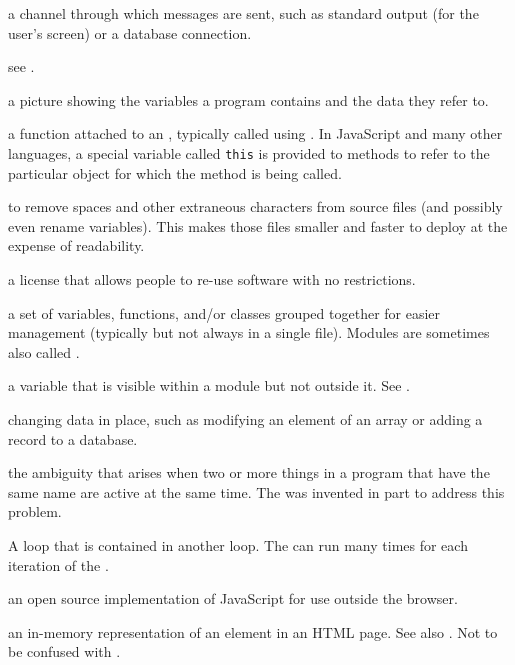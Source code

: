 \begin{description}
a channel through which  messages are sent, such as
standard output (for the user's screen) or a database connection.

see .

a picture showing the variables a program contains and the data they refer to.

a function attached to an , typically called using . In JavaScript and many other languages, a
special variable called \texttt{this} is provided to methods to refer to the
particular object for which the method is being called.

to remove spaces and other extraneous characters from source files (and
possibly even rename variables). This makes those files smaller and faster to
deploy at the expense of readability.

a license that allows people to re-use software with no restrictions.

a set of variables, functions, and/or classes grouped together for easier
management (typically but not always in a single file). Modules are sometimes
also called .

a variable that is visible within a module but not outside it. See
.

changing data in place, such as modifying an element of an array or adding a
record to a database.

the ambiguity that arises when two or more things in a program that have the
same name are active at the same time. The  was
invented in part to address this problem.

A loop that is contained in another loop. The 
can run many times for each iteration of the .

an open source implementation of JavaScript for use outside the browser.

an in-memory representation of an element in an HTML page. See also
. Not to be confused with .


\end{description}
